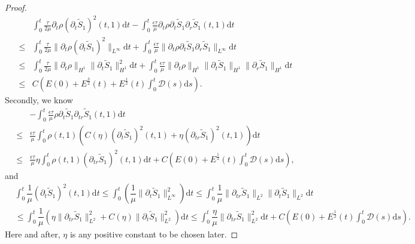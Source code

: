 \documentclass[10pt,reqno]{amsart}
\numberwithin{equation}{section}
\begin{document}
\begin{proof}
\begin{equation}
\begin{aligned}
				&\int_{0}^{t}\frac{\tau}{2\mu}\partial_{t}\rho(\partial_{t}\tilde{S}_1)^2(t,1)\mathrm{d}t
				-\int_{0}^{t}\frac{\epsilon\tau}{\mu}\partial_{t}\rho\partial_{t}\tilde{S}_1\partial_{r}\tilde{S}_1(t,1)\mathrm{d}t
				\\
				\leq&\int_{0}^{t}\frac{\tau}{2\mu}\|\partial_{t}\rho(\partial_{t}\tilde{S}_1)^2\|_{L^\infty}\mathrm{d}t
				+\int_{0}^{t}\frac{\epsilon\tau}{\mu}\|\partial_{t}\rho\partial_{t}\tilde{S}_1\partial_{r}\tilde{S}_1\|_{L^\infty}\mathrm{d}t\\
				\leq&\int_{0}^{t}\frac{\tau}{2\mu}\|\partial_{t}\rho\|_{H^1}\|\partial_{t}\tilde{S}_1\|_{H^1}^2\mathrm{d}t
				+\int_{0}^{t}\frac{\epsilon\tau}{\mu}\|\partial_{t}\rho\|_{H^1}\|\partial_{t}\tilde{S}_1\|_{H^1}\|\partial_{r}\tilde{S}_1\|_{H^1}\mathrm{d}t\\
				\leq&C\left(E(0)+E^{\frac{3}{2}}(t)+E^{\frac{1}{2}}(t) \int_{0}^t \mathcal{D}(s)\mathrm{d}s\right).
			\end{aligned}
		\end{equation}
		Secondly, we know
		\begin{equation}\nonumber
			\begin{aligned}
				&-\int_{0}^{t}\frac{\epsilon\tau}{\mu}\rho\partial_{t}\tilde{S}_1\partial_{tr}\tilde{S}_1(t,1)\mathrm{d}t\\
				\leq&\frac{\epsilon\tau}{\mu}\int_{0}^{t}\rho(t,1) \left(C(\eta)(\partial_{t}\tilde{S}_1)^2(t,1)+\eta(\partial_{tr}\tilde{S}_1)^2(t,1)\right)\mathrm{d}t\\
				\leq&\frac{\epsilon\tau}{\mu}\eta\int_{0}^{t}\rho(t,1)(\partial_{tr}\tilde{S}_1)^2(t,1)\mathrm{d}t
				+C\left(E(0)+E^{\frac{1}{2}}(t) \int_{0}^t \mathcal{D}(s)\mathrm{d}s\right),
			\end{aligned}
		\end{equation}
		and
		\begin{equation}
			\begin{aligned}\nonumber
				&\int_{0}^{t}\dfrac{1}{\mu} (\partial_{t}\tilde{S}_1)^2(t,1)\mathrm{d}t
				\leq \int_{0}^{t}(\dfrac{1}{\mu}\|\partial_{t}\tilde{S}_1\|_{L^\infty}^2)\mathrm{d}t
				\leq \int_{0}^{t}\dfrac{1}{\mu}\|\partial_{tr}\tilde{S}_1\|_{L^2}\|\partial_{t}\tilde{S}_1\|_{L^2}\mathrm{d}t\\
				&\leq \int_{0}^{t}\dfrac{1}{\mu} (\eta\|\partial_{tr}\tilde{S}_1\|_{L^2}^2+C(\eta)\|\partial_{t}\tilde{S}_1\|_{L^2}^2)\mathrm{d}t
				\leq \int_{0}^{t}\dfrac{\eta}{\mu}\|\partial_{tr}\tilde{S}_1\|_{L^2}^2\mathrm{d}t+C\left(E(0)+E^{\frac{1}{2}}(t) \int_{0}^t \mathcal{D}(s)\mathrm{d}s\right).
			\end{aligned}
		\end{equation}
		Here and after, $\eta$ is any positive constant to be chosen later.


\end{proof}
\end{document}
